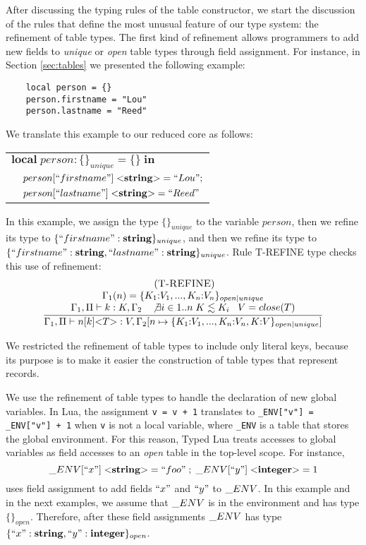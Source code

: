 After discussing the typing rules of the table constructor,
we start the discussion of the rules that define the most
unusual feature of our type system: the refinement of table types.
The first kind of refinement allows programmers to add new
fields to \emph{unique} or \emph{open} table types through
field assignment.
For instance, in Section \ref{sec:tables} we presented the
following example:
\begin{verbatim}
    local person = {}
    person.firstname = "Lou"
    person.lastname = "Reed"
\end{verbatim}

We translate this example to our reduced core as follows:
\begin{center}
\begin{tabular}{ll}
\multicolumn{2}{l}{$\mathbf{local} \; person:\{\}_{unique} = \{\} \; \mathbf{in}$}\\
& \multicolumn{1}{l}{$person[``firstname"] \; {<}\mathbf{string}{>} = ``Lou";$}\\
& \multicolumn{1}{l}{$person[``lastname"] \; {<}\mathbf{string}{>} = ``Reed"$}
\end{tabular}
\end{center}

In this example, we assign the type $\{\}_{unique}$ to the variable
$person$, then we refine its type to $\{``firstname":\mathbf{string}\}_{unique}$,
and then we refine its type to $\{``firstname":\mathbf{string}, ``lastname":\mathbf{string}\}_{unique}$.
Rule \textsc{T-REFINE} type checks this use of refinement:
\[
\begin{array}{c}
\; (\textsc{T-REFINE})\\
\dfrac{\begin{array}{c}
       \Gamma_{1}(n) = \{ K_{1}{:}V_{1}, ..., K_{n}{:}V_{n} \}_{open|unique}\\
       \Gamma_{1}, \Pi \vdash k:K, \Gamma_{2} \;\;\;
       \not \exists i \in 1..n \; K \lesssim K_{i} \;\;\;
       V = close(T)
       \end{array}}
      {\Gamma_{1}, \Pi \vdash n[k] {<}T{>}:V, \Gamma_{2}[n \mapsto \{ K_{1}{:}V_{1}, ..., K_{n}{:}V_{n}, K{:}V\}_{open|unique}]}
\end{array}
\]

We restricted the refinement of table types to include only literal
keys, because its purpose is to make it easier the construction of
table types that represent records.

We use the refinement of table types to handle the declaration of
new global variables.
In Lua, the assignment \texttt{v = v + 1} translates to
\texttt{\string_ENV["v"] = \string_ENV["v"] + 1} when \texttt{v}
is not a local variable, where \texttt{\string_ENV} is a table
that stores the global environment.
For this reason, Typed Lua treats accesses to global variables as field accesses
to an \emph{open} table in the top-level scope.
For instance,
\[
\string_ENV[``x"] \; {<}\String{>} = ``foo" \;;\; \string_ENV[``y"] \; {<}\Integer{>} = 1
\]
uses field assignment to add fields $``x"$ and $``y"$ to $\string_ENV$.
In this example and in the next examples, we assume that
$\string_ENV$ is in the environment and has type $\{\}_{open}$.
Therefore, after these field assignments $\string_ENV$ has type
$\{``x":\mathbf{string}, ``y":\mathbf{integer}\}_{open}$.

